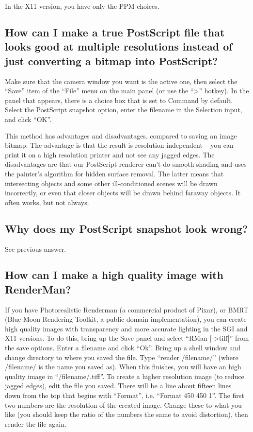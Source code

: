 \documentclass[12pt,a4paper]{article}
\begin{document}
        In the X11 version, you have only the PPM choices.

    \subsection{How can I make a true PostScript file that looks good at multiple resolutions instead of just converting a bitmap into PostScript?}

        Make sure that the camera window you want is the active one, then select
        the ``Save'' item of the ``File'' menu on the main panel (or use the ``>''
        hotkey). In the panel that appears, there is a choice box that is set to
        Command by default. Select the PostScript snapshot option, enter the
        filename in the Selection input, and click ``OK''.

        This method has advantages and disadvantages, compared to saving an
        image bitmap. The advantage is that the result is resolution independent
        -- you can print it on a high resolution printer and not see any jagged
        edges. The disadvantages are that our PostScript renderer can't do
        smooth shading and uses the painter's algorithm for hidden surface
        removal. The latter means that intersecting objects and some other
        ill-conditioned scenes will be drawn incorrectly, or even that closer
        objects will be drawn behind faraway objects. It often works, but not
        always.

    \subsection{Why does my PostScript snapshot look wrong?}

        See previous answer.

    \subsection{How can I make a high quality image with RenderMan?}

        If you have Photorealistic Renderman (a commercial product of Pixar), or
        BMRT (Blue Moon Rendering Toolkit, a public domain implementation), you
        can create high quality images with transparency and more accurate
        lighting in the SGI and X11 versions. To do this, bring up the Save
        panel and select ``RMan [->tiff]'' from the save options. Enter a filename
        and click ``Ok''. Bring up a shell window and change directory to where
        you saved the file. Type ``render /filename/'' (where /filename/ is the
        name you saved as). When this finishes, you will have an high quality
        image in ``/filename/.tiff''. To create a higher resolution image (to
        reduce jagged edges), edit the file you saved. There will be a line
        about fifteen lines down from the top that begins with ``Format'', i.e.
        ``Format 450 450 1''. The first two numbers are the resolution of the
        created image. Change these to what you like (you should keep the ratio
        of the numbers the same to avoid distortion), then render the file again.
\end{document}
